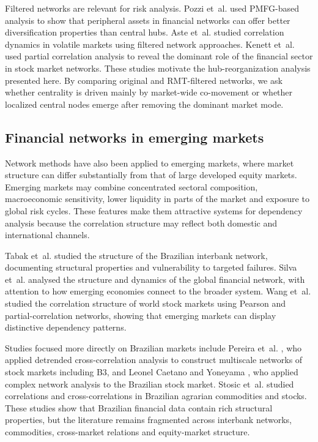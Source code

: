 Filtered networks are relevant for risk analysis. Pozzi et~al. \cite{pozzi_2013_spread} used PMFG-based analysis to show that peripheral assets in financial networks can offer better diversification properties than central hubs. Aste et~al. \cite{aste_2010_correlation} studied correlation dynamics in volatile markets using filtered network approaches. Kenett et~al. \cite{kenett_2012_dominating} used partial correlation analysis to reveal the dominant role of the financial sector in stock market networks. These studies motivate the hub-reorganization analysis presented here. By comparing original and RMT-filtered networks, we ask whether centrality is driven mainly by market-wide co-movement or whether localized central nodes emerge after removing the dominant market mode.

\subsection{Financial networks in emerging markets}

Network methods have also been applied to emerging markets, where market structure can differ substantially from that of large developed equity markets. Emerging markets may combine concentrated sectoral composition, macroeconomic sensitivity, lower liquidity in parts of the market and exposure to global risk cycles. These features make them attractive systems for dependency analysis because the correlation structure may reflect both domestic and international channels.

Tabak et~al. \cite{tabak_2010_topology} studied the structure of the Brazilian interbank network, documenting structural properties and vulnerability to targeted failures. Silva et~al. \cite{silva_2016_structure} analysed the structure and dynamics of the global financial network, with attention to how emerging economies connect to the broader system. Wang et~al. \cite{wang_2018_correlation} studied the correlation structure of world stock markets using Pearson and partial-correlation networks, showing that emerging markets can display distinctive dependency patterns.

Studies focused more directly on Brazilian markets include Pereira et~al. \cite{pereira_2019_multiscale}, who applied detrended cross-correlation analysis to construct multiscale networks of stock markets including B3, and Leonel Caetano and Yoneyama \cite{leonel_2022_brazilian}, who applied complex network analysis to the Brazilian stock market. Stosic et~al. \cite{stosic_2015_correlations} studied correlations and cross-correlations in Brazilian agrarian commodities and stocks. These studies show that Brazilian financial data contain rich structural properties, but the literature remains fragmented across interbank networks, commodities, cross-market relations and equity-market structure.

